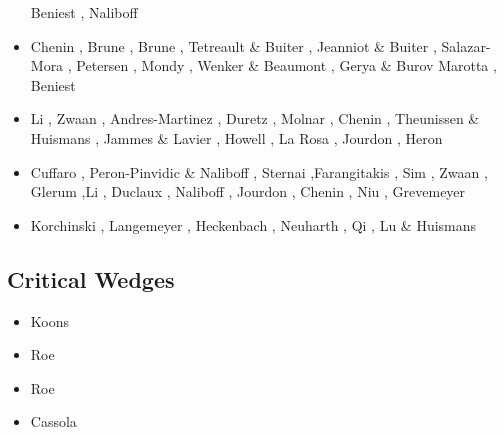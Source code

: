 \begin{scriptsize}
\begin{itemize}
                       Beniest \etal \cite{bekb17}, Naliboff \etal \cite{nabp17}
\item[\twothousandeighteen] Chenin \etal \cite{chsm18}, Brune \etal \cite{brwm18},
                      Brune \cite{brun18}, Tetreault \& Buiter \cite{tebu18},
                      Jeanniot \& Buiter \cite{jebu18}, Salazar-Mora \etal \cite{sahf18},
                      Petersen \etal \cite{pesn18}, Mondy \etal \cite{mord18},
                      Wenker \& Beaumont \cite{webe18,webe18b},
                      Gerya \& Burov \cite{gebu18} Marotta \etal \cite{marc18},
                      Beniest \etal \cite{bews18} 
\item[\twothousandnineteen] Li \etal \cite{lisp19}, Zwaan \etal \cite{zwsb19}, 
                      Andres-Martinez \etal \cite{anpa19}, Duretz \etal \cite{dual19},
                      Molnar \etal \cite{mocb19}, Chenin \etal \cite{chmd19},
                      Theunissen \& Huismans \cite{thhu19}, Jammes \& Lavier \cite{jala19},
                      Howell \etal \cite{hooi19}, La Rosa \etal \cite{lapk19}, 
                      Jourdon \etal \cite{jolm19}, Heron \etal \cite{hepm19}
\item[\twothousandtwenty] Cuffaro \etal \cite{cump20}, Peron-Pinvidic \& Naliboff \cite{pena20}, 
                          Sternai \cite{ster20},Farangitakis \etal \cite{fahm20}, Sim \etal \cite{siss20}, 
                          Zwaan \etal \cite{zwsr20}, Glerum \etal \cite{glbs20},Li \etal \cite{lial20}, 
                          Duclaux \etal \cite{duhm20}, Naliboff \etal \cite{nagb20}, 
                          Jourdon \etal \cite{jolm20}, Chenin \etal \cite{chsm20}, 
                          Niu \cite{niu20}, Grevemeyer \etal \cite{grrm21}
\item[\twothousandtwentyone] Korchinski \etal \cite{kotr21}, Langemeyer \etal \cite{lalt21},
                             Heckenbach \etal \cite{hebg21}, Neuharth \etal \cite{nebg21},
                             Qi \etal \cite{qill21}, Lu \& Huismans \cite{luhu21}
\end{itemize}
\end{scriptsize}

\subsection{Critical Wedges}

\begin{scriptsize}
\begin{itemize}
\item[\nineteenninetyfour] Koons \cite{koon94}
\item[\twothousandsix] Roe \etal \cite{rosw06}
\item[\twothousandeight] Roe \etal \cite{rowf08}
\item[\twothousandthirteen] Cassola \cite{cass13}
\end{itemize}
\end{scriptsize}

